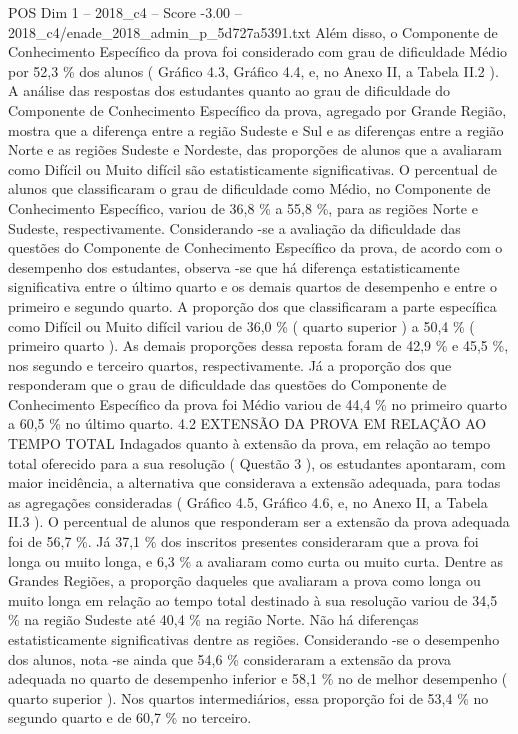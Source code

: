 \begin{textsample}{POS Dim 1 – 2018\_c4 – Score -3.00 – 2018\_c4/enade\_2018\_admin\_p\_5d727a5391.txt}
Além disso, o Componente de Conhecimento Específico da prova foi considerado com grau de dificuldade Médio por 52,3 \% dos alunos ( Gráfico 4.3, Gráfico 4.4, e, no Anexo II, a Tabela II.2 ).
A análise das respostas dos estudantes quanto ao grau de dificuldade do Componente de Conhecimento Específico da prova, agregado por Grande Região, mostra que a diferença entre a região Sudeste e Sul e as diferenças entre a região Norte e as regiões Sudeste e Nordeste, das proporções de alunos que a avaliaram como Difícil ou Muito difícil são estatisticamente significativas.
O percentual de alunos que classificaram o grau de dificuldade como Médio, no Componente de Conhecimento Específico, variou de 36,8 \% a 55,8 \%, para as regiões Norte e Sudeste, respectivamente.
Considerando -se a avaliação da dificuldade das questões do Componente de Conhecimento Específico da prova, de acordo com o desempenho dos estudantes, observa -se que há diferença estatisticamente significativa entre o último quarto e os demais quartos de desempenho e entre o primeiro e segundo quarto.
A proporção dos que classificaram a parte específica como Difícil ou Muito difícil variou de 36,0 \% ( quarto superior ) a 50,4 \% ( primeiro quarto ).
As demais proporções dessa reposta foram de 42,9 \% e 45,5 \%, nos segundo e terceiro quartos, respectivamente.
Já a proporção dos que responderam que o grau de dificuldade das questões do Componente de Conhecimento Específico da prova foi Médio variou de 44,4 \% no primeiro quarto a 60,5 \% no último quarto. 4.2 EXTENSÃO DA PROVA EM RELAÇÃO AO TEMPO TOTAL Indagados quanto à extensão da prova, em relação ao tempo total oferecido para a sua resolução ( Questão 3 ), os estudantes apontaram, com maior incidência, a alternativa que considerava a extensão adequada, para todas as agregações consideradas ( Gráfico 4.5, Gráfico 4.6, e, no Anexo II, a Tabela II.3 ).
O percentual de alunos que responderam ser a extensão da prova adequada foi de 56,7 \%.
Já 37,1 \% dos inscritos presentes consideraram que a prova foi longa ou muito longa, e 6,3 \% a avaliaram como curta ou muito curta.
Dentre as Grandes Regiões, a proporção daqueles que avaliaram a prova como longa ou muito longa em relação ao tempo total destinado à sua resolução variou de 34,5 \% na região Sudeste até 40,4 \% na região Norte.
Não há diferenças estatisticamente significativas dentre as regiões.
Considerando -se o desempenho dos alunos, nota -se ainda que 54,6 \% consideraram a extensão da prova adequada no quarto de desempenho inferior e 58,1 \% no de melhor desempenho ( quarto superior ).
Nos quartos intermediários, essa proporção foi de 53,4 \% no segundo quarto e de 60,7 \% no terceiro.

\end{textsample}
